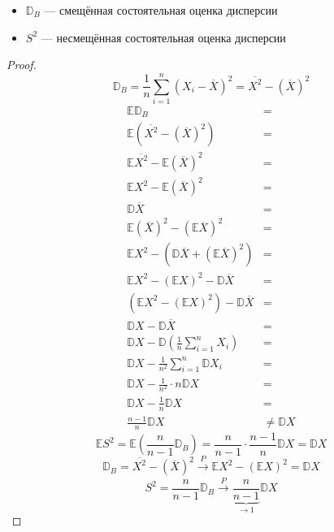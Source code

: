 \begin{theorem}\itemfix
    \begin{itemize}
        \item \(\mathbb{D}_B\) --- смещённая состоятельная оценка дисперсии
        \item \(S^2\) --- несмещённая состоятельная оценка дисперсии
    \end{itemize}
\end{theorem}
\begin{proof}
    \[\mathbb{D}_B = \frac{1}{n} \sum_{i=1}^{n} (X_i - \overline{X})^2 = \overline{X^2} - (\overline{X})^2\]
    \begin{align*}
        \mathbb{E} \mathbb{D}_B                                                  & =                 \\ \mathbb{E} (\overline{X^2} - (\overline{X})^2) & = \\ \mathbb{E} \overline{X^2} - \mathbb{E} (\overline{X})^2 & = \\ \mathbb{E} X^2 - \mathbb{E} (\overline{X})^2 & = \\ \mathbb{D} \overline{X} & = \\ \mathbb{E} (\overline{X})^2 - (\mathbb{E} \overline{X})^2 & = \\
        \mathbb{E} X^2 - (\mathbb{D} \overline{X} + (\mathbb{E} \overline{X})^2) & =                 \\
        \mathbb{E} X^2 - (\mathbb{E} X)^2 - \mathbb{D} \overline{X}              & =                 \\
        (\mathbb{E} X^2 - (\mathbb{E} X)^2) - \mathbb{D} \overline{X}            & =                 \\
        \mathbb{D} X - \mathbb{D} \overline{X}                                   & =                 \\
        \mathbb{D} X - \mathbb{D} \left( \frac{1}{n} \sum_{i=1}^{n} X_i \right)  & =                 \\
        \mathbb{D} X - \frac{1}{n^2} \sum_{i=1}^{n} \mathbb{D} X_i               & =                 \\
        \mathbb{D} X - \frac{1}{n^2} \cdot n \mathbb{D} X                        & =                 \\
        \mathbb{D} X - \frac{1}{n} \mathbb{D} X                                  & =                 \\
        \frac{n - 1}{n} \mathbb{D} X                                             & \neq \mathbb{D} X
    \end{align*}
    \[\mathbb{E} S^2 = \mathbb{E} \left( \frac{n}{n -1} \mathbb{D}_B \right) = \frac{n}{n - 1} \cdot \frac{n - 1}{n} \mathbb{D} X = \mathbb{D} X\]
    \[\mathbb{D}_B = \overline{X^2} - (\overline{X})^2 \xrightarrow[]{P} \mathbb{E} X^2 - (\mathbb{E} X)^2 = \mathbb{D} X\]
    \[S^2 = \frac{n}{n - 1} \mathbb{D}_B \xrightarrow[]{P} \underbrace{\frac{n}{n - 1}}_{ \to 1} \mathbb{D} X\]
\end{proof}

